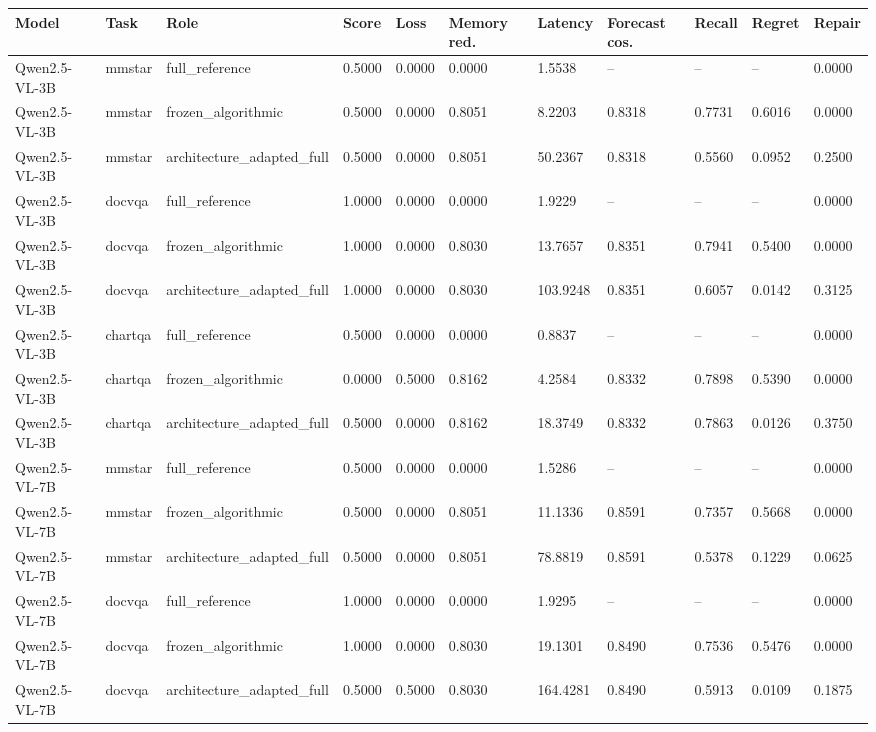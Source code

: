 \begin{tabular}{lllllllllll}
\toprule
Model & Task & Role & Score & Loss & Memory red. & Latency & Forecast cos. & Recall & Regret & Repair \\
\midrule
Qwen2.5-VL-3B & mmstar & full\_reference & 0.5000 & 0.0000 & 0.0000 & 1.5538 & -- & -- & -- & 0.0000 \\
Qwen2.5-VL-3B & mmstar & frozen\_algorithmic & 0.5000 & 0.0000 & 0.8051 & 8.2203 & 0.8318 & 0.7731 & 0.6016 & 0.0000 \\
Qwen2.5-VL-3B & mmstar & architecture\_adapted\_full & 0.5000 & 0.0000 & 0.8051 & 50.2367 & 0.8318 & 0.5560 & 0.0952 & 0.2500 \\
Qwen2.5-VL-3B & docvqa & full\_reference & 1.0000 & 0.0000 & 0.0000 & 1.9229 & -- & -- & -- & 0.0000 \\
Qwen2.5-VL-3B & docvqa & frozen\_algorithmic & 1.0000 & 0.0000 & 0.8030 & 13.7657 & 0.8351 & 0.7941 & 0.5400 & 0.0000 \\
Qwen2.5-VL-3B & docvqa & architecture\_adapted\_full & 1.0000 & 0.0000 & 0.8030 & 103.9248 & 0.8351 & 0.6057 & 0.0142 & 0.3125 \\
Qwen2.5-VL-3B & chartqa & full\_reference & 0.5000 & 0.0000 & 0.0000 & 0.8837 & -- & -- & -- & 0.0000 \\
Qwen2.5-VL-3B & chartqa & frozen\_algorithmic & 0.0000 & 0.5000 & 0.8162 & 4.2584 & 0.8332 & 0.7898 & 0.5390 & 0.0000 \\
Qwen2.5-VL-3B & chartqa & architecture\_adapted\_full & 0.5000 & 0.0000 & 0.8162 & 18.3749 & 0.8332 & 0.7863 & 0.0126 & 0.3750 \\
Qwen2.5-VL-7B & mmstar & full\_reference & 0.5000 & 0.0000 & 0.0000 & 1.5286 & -- & -- & -- & 0.0000 \\
Qwen2.5-VL-7B & mmstar & frozen\_algorithmic & 0.5000 & 0.0000 & 0.8051 & 11.1336 & 0.8591 & 0.7357 & 0.5668 & 0.0000 \\
Qwen2.5-VL-7B & mmstar & architecture\_adapted\_full & 0.5000 & 0.0000 & 0.8051 & 78.8819 & 0.8591 & 0.5378 & 0.1229 & 0.0625 \\
Qwen2.5-VL-7B & docvqa & full\_reference & 1.0000 & 0.0000 & 0.0000 & 1.9295 & -- & -- & -- & 0.0000 \\
Qwen2.5-VL-7B & docvqa & frozen\_algorithmic & 1.0000 & 0.0000 & 0.8030 & 19.1301 & 0.8490 & 0.7536 & 0.5476 & 0.0000 \\
Qwen2.5-VL-7B & docvqa & architecture\_adapted\_full & 0.5000 & 0.5000 & 0.8030 & 164.4281 & 0.8490 & 0.5913 & 0.0109 & 0.1875 \\

\end{tabular}

